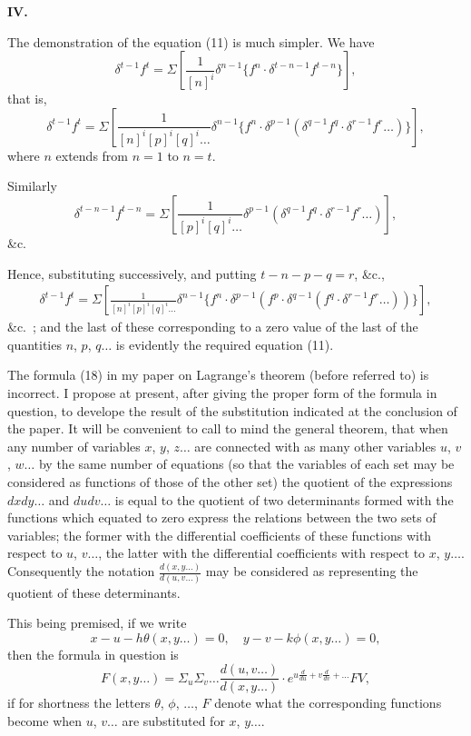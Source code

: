 \documentclass[11pt,a4paper]{article}
\theoremstyle{plain}
\begin{document}
\bigskip
\noindent\textbf{IV.}

The demonstration of the equation (11) is much simpler. We have
\[ \delta^{t-1} f^t = \Sigma \left[ \frac{1}{[n]^i} \delta^{n-1} \{ f^n \cdot \delta^{t-n-1} f^{t-n} \} \right], \]
that is,
\[ \delta^{t-1} f^t = \Sigma \left[ \frac{1}{[n]^i [p]^i [q]^i \ldots} \delta^{n-1} \{ f^n \cdot \delta^{p-1} (\delta^{q-1} f^q \cdot \delta^{r-1} f^r \ldots) \} \right], \]
where $n$ extends from $n=1$ to $n=t$.

Similarly
\[ \delta^{t-n-1} f^{t-n} = \Sigma \left[ \frac{1}{[p]^i [q]^i \ldots} \delta^{p-1} (\delta^{q-1} f^q \cdot \delta^{r-1} f^r \ldots) \right], \]
\&c.

Hence, substituting successively, and putting $t - n - p - q = r$, \&c.,
\begin{multline*}
\delta^{t-1} f^t = \Sigma \left[ \frac{1}{[n]^i [p]^i [q]^i \ldots} \delta^{n-1} \{ f^n \cdot \delta^{p-1} (f^p \cdot \delta^{q-1} (f^q \cdot \delta^{r-1} f^r \ldots)) \} \right],
\end{multline*}
\&c.\ ;
and the last of these corresponding to a zero value of the last of the quantities $n$, $p$, $q \ldots$ is evidently the required equation (11).

The formula (18) in my paper on Lagrange's theorem (before referred to) is incorrect. I propose at present, after giving the proper form of the formula in question, to develope the result of the substitution indicated at the conclusion of the paper. It will be convenient to call to mind the general theorem, that when any number of variables $x$, $y$, $z \ldots$ are connected with as many other variables $u$, $v$, $w \ldots$ by the same number of equations (so that the variables of each set may be considered as functions of those of the other set) the quotient of the expressions $dxdy\ldots$ and $dudv\ldots$ is equal to the quotient of two determinants formed with the functions which equated to zero express the relations between the two sets of variables; the former with the differential coefficients of these functions with respect to $u$, $v \ldots$, the latter with the differential coefficients with respect to $x$, $y \ldots$. Consequently the notation $\frac{d(x,y\ldots)}{d(u,v\ldots)}$ may be considered as representing the quotient of these determinants.

This being premised, if we write
\[ x - u - h\theta(x,y\ldots) = 0, \quad y - v - k\phi(x,y\ldots) = 0, \]
then the formula in question is
\[ F(x,y\ldots) = \Sigma_u \Sigma_v \ldots \frac{d(u,v\ldots)}{d(x,y\ldots)} \cdot e^{u\frac{d}{du} + v\frac{d}{dv} + \ldots} FV, \]
if for shortness the letters $\theta$, $\phi$, $\ldots$, $F$ denote what the corresponding functions become when $u$, $v \ldots$ are substituted for $x$, $y \ldots$.
\end{document}
